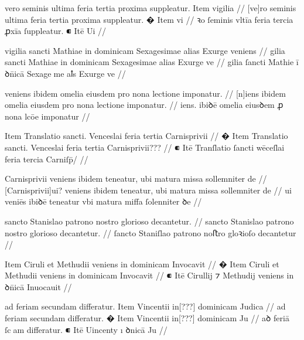 \ex \bg
\gla
{}
vero seminis ultima feria tertia proxima suppleatur.
{} Item vigilia
//
\glRekonstrukcja
{}
[ve]ro seminis ultima feria tertia proxima suppleatur.
� Item vi
//
\glU
{}
ꝛo ſeminis vltīa feria tercia ꝓxīa ſuppleatur. ⁌ Itē Ui
//
\endgl
\xe



\ex \bg
\gla
{}
vigilia sancti Mathiae in dominicam Sexagesimae alias Exurge
veniens
//
\glRekonstrukcja
{}
gilia sancti Mathiae in dominicam Sexagesimae alias Exurge
ve
//
\glU
{}
gilia ſancti Mathie ī ꝺn̄icā Sexageme aꝉs Exurge ve
//
\endgl
\xe



\ex \bg
\gla
{}
veniens ibidem omelia eiusdem pro nona lectione imponatur.
//
\glRekonstrukcja
{}
[n]iens ibidem omelia eiusdem pro nona lectione imponatur.
//
\glU
{}
iens. ibiꝺē omelia eiusꝺem ꝓ nona lcōe imponatur
//
\endgl
\xe



\ex \bg
\gla
{} {} Item Translatio sancti. Venceslai feria tertia Carnisprivii
//
\glRekonstrukcja
{}
� Item Translatio sancti. Venceslai feria tertia Carnisprivii???
//
\glU
{}
⁌ Itē Tranſlatio ſancti wēceſlai feria tercia Carniſp̄/
//
\endgl
\xe



\ex \bg
\gla
{}
Carnisprivii veniens
ibidem teneatur, ubi matura missa sollemniter de
//
\glRekonstrukcja
{}
[Carnisprivii]ui? veniens
ibidem teneatur, ubi matura missa sollemniter de
//
\glU
{}
ui veniēs ibiꝺē teneatur vbi matura miﬀa ſolenniter ꝺe
//
\endgl
\xe



\ex \bg
\gla
{}
sancto Stanislao patrono nostro glorioso decantetur.
//
\glRekonstrukcja
{}
sancto Stanislao patrono nostro glorioso decantetur.
//
\glU
{}
ſancto Staniſlao patrono noﬅro gloꝛioſo decantetur
//
\endgl
\xe



\ex \bg
\gla
{}
{} Item Ciruli et Methudii veniens in dominicam Invocavit
//
\glRekonstrukcja
{}
� Item Ciruli et Methudii veniens in dominicam Invocavit
//
\glU
{}
⁌ Itē Cirullij ⁊ Methudij veniens in ꝺn̄icā Inuocauit
//
\endgl
\xe



\ex \bg
\gla
{}
ad feriam
secundam differatur.
{} Item Vincentii in[???] dominicam Judica
//
\glRekonstrukcja
{}
ad feriam
secundam differatur.
� Item Vincentii in[???] dominicam Ju
//
\glU
{}
aꝺ feriā ſcam differatur. ⁌ Itē Uincenty ı ꝺnicā Ju
//
\endgl
\xe


